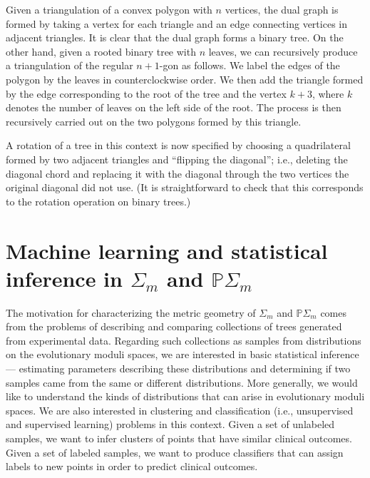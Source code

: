 \documentclass[a4paper,11pt]{article}
\begin{document}
Given a triangulation of a convex polygon with $n$ vertices, the dual graph is formed by taking a vertex for each triangle and an edge connecting vertices in adjacent triangles.
It is clear that the dual graph forms a binary tree.
On the other hand, given a rooted binary tree with $n$ leaves, we can recursively produce a triangulation of the regular $n+1$-gon as follows.
We label the edges of the polygon by the leaves in counterclockwise order.
We then add the triangle formed by the edge corresponding to the root of the tree and the vertex $k+3$, where $k$ denotes the number of leaves on the left side of the root.
The process is then recursively carried out on the two polygons formed by this triangle.

A rotation of a tree in this context is now specified by choosing a quadrilateral formed by two adjacent triangles and ``flipping the diagonal''; i.e., deleting the diagonal chord and replacing it with the diagonal through the two vertices the original diagonal did not use.
(It is straightforward to check that this corresponds to the rotation operation on binary trees.)


\section{Machine learning and statistical inference in $\Sigma_m$ and $\mathbb{P}\Sigma_m$}\label{sec:ML}

The motivation for characterizing the metric geometry of $\Sigma_m$ and $\mathbb{P}\Sigma_m$ comes from the problems of describing and comparing collections of trees generated from experimental data.
Regarding such collections as samples from distributions on the evolutionary moduli spaces, we are interested in basic statistical inference --- estimating parameters describing these distributions and determining if two samples came from the same or different distributions.
More generally, we would like to understand the kinds of distributions that can arise in evolutionary moduli spaces.
We are also interested in clustering and classification (i.e., unsupervised and supervised learning) problems in this context.
Given a set of unlabeled samples, we want to infer clusters of points that have similar clinical outcomes.
Given a set of labeled samples, we want to produce classifiers that can assign labels to new points in order to predict clinical outcomes.
\end{document}
